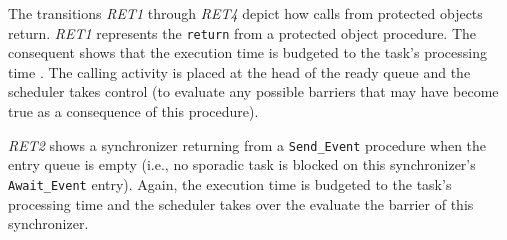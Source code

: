 
The transitions \emph{RET1} through \emph{RET4} depict how calls from
protected objects return. \emph{RET1} represents the \texttt{return}
from a protected object procedure. The consequent shows that the
execution time is budgeted to the task's processing time . The
calling activity is placed at the head of the ready queue and the
scheduler takes control (to evaluate any possible barriers that may
have become true as a consequence of this procedure).


\emph{RET2} shows a synchronizer returning from a \texttt{Send\_Event}
procedure when the entry queue is empty (i.e., no sporadic task is
blocked on this synchronizer's \texttt{Await\_Event} entry). Again,
the execution time is budgeted to the task's processing time 
and the scheduler takes over the evaluate the barrier of this
synchronizer.


